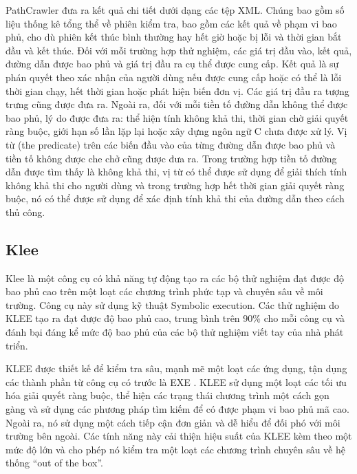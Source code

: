\documentclass[12pt,a4paper]{article}
\begin{document}
\indent PathCrawler đưa ra kết quả chi tiết dưới dạng các tệp XML. Chúng bao gồm số liệu thống kê tổng thể về phiên kiểm tra, bao gồm các kết quả về phạm vi bao phủ, cho dù phiên kết thúc bình thường hay hết giờ hoặc bị lỗi và thời gian bắt đầu và kết thúc. Đối với mỗi trường hợp thử nghiệm, các giá trị đầu vào, kết quả, đường dẫn được bao phủ và giá trị đầu ra cụ thể được cung cấp. Kết quả là sự phán quyết theo xác nhận của người dùng nếu được cung cấp hoặc có thể là lỗi thời gian chạy, hết thời gian hoặc phát hiện biến đơn vị. Các giá trị đầu ra tượng trưng cũng được đưa ra. Ngoài ra, đối với mỗi tiền tố đường dẫn không thể được bao phủ, lý do được đưa ra: thể hiện tính không khả thi, thời gian chờ giải quyết ràng buộc, giới hạn số lần lặp lại hoặc xây dựng ngôn ngữ C chưa được xử lý. Vị từ (the predicate) trên các biến đầu vào của từng đường dẫn được bao phủ và tiền tố không được che chở cũng được đưa ra. Trong trường hợp tiền tố đường dẫn được tìm thấy là không khả thi, vị từ có thể được sử dụng để giải thích tính không khả thi cho người dùng và trong trường hợp hết thời gian giải quyết ràng buộc, nó có thể được sử dụng để xác định tính khả thi của đường dẫn theo cách thủ công.
\subsection{Klee}
Klee là một công cụ có khả năng tự động tạo ra các bộ thử nghiệm đạt được độ bao phủ cao trên một loạt các chương trình phức tạp và chuyên sâu về môi trường. Công cụ này sử dụng kỹ thuật Symbolic execution. Các thử nghiệm do KLEE tạo ra đạt được độ bao phủ cao, trung bình trên 90\% cho mỗi công cụ và đánh bại đáng kể mức độ bao phủ của các bộ thử nghiệm viết tay của nhà phát triển.

\indent KLEE được thiết kế để kiểm tra sâu, mạnh mẽ một loạt các ứng dụng, tận dụng các thành phần từ công cụ có trước là EXE \cite{cadar2008exe}. KLEE sử dụng một loạt các tối ưu hóa giải quyết ràng buộc, thể hiện các trạng thái chương trình một cách gọn gàng và sử dụng các phương pháp tìm kiếm để có được phạm vi bao phủ mã cao. Ngoài ra, nó sử dụng một cách tiếp cận đơn giản và dễ hiểu để đối phó với môi trường bên ngoài. Các tính năng này cải thiện hiệu suất của KLEE kèm theo một mức độ lớn và cho phép nó kiểm tra một loạt các chương trình chuyên sâu về hệ thống “out of the box”.
\end{document}
